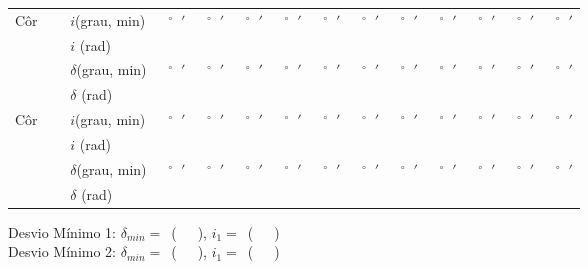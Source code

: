 \documentclass[a4paper,12pt]{article}  %
\begin{document}
\begin{center}
	\begin{tabular}{|l|l|r|r|r|r|r|r|r|r|r|r|r|}
	\hline
	\hline
	Côr $\quad$ & $i$(grau, min)   & $\;\;^{\circ}\;\;'$ & $\;\;^{\circ}\;\;'$ & $\;\;^{\circ}\;\;'$ & $\;\;^{\circ}\;\;'$ & $\;\;^{\circ}\;\;'$ & $\;\;^{\circ}\;\;'$ &  $\;\;^{\circ}\;\;'$& $\;\;^{\circ}\;\;'$ &  $\;\;^{\circ}\;\;'$& $\;\;^{\circ}\;\;'$ &  $\;\;^{\circ}\;\;'$  \\ \cline{2-13}
& $i$ (rad)   & & & & & & & & & & &  \\ \cline{2-13}
	 &  $\delta$(grau, min)&$\;\;^{\circ}\;\;'$ & $\;\;^{\circ}\;\;'$ & $\;\;^{\circ}\;\;'$ & $\;\;^{\circ}\;\;'$ & $\;\;^{\circ}\;\;'$ & $\;\;^{\circ}\;\;'$ &  $\;\;^{\circ}\;\;'$& $\;\;^{\circ}\;\;'$ &  $\;\;^{\circ}\;\;'$& $\;\;^{\circ}\;\;'$ &  $\;\;^{\circ}\;\;'$\\ \cline{2-13}
	&  $\delta$  (rad)   & & & & & & & & & & &  \\	\hline
	Côr $\quad$ & $i$(grau, min)   & $\;\;^{\circ}\;\;'$ & $\;\;^{\circ}\;\;'$ & $\;\;^{\circ}\;\;'$ & $\;\;^{\circ}\;\;'$ & $\;\;^{\circ}\;\;'$ & $\;\;^{\circ}\;\;'$ &  $\;\;^{\circ}\;\;'$& $\;\;^{\circ}\;\;'$ &  $\;\;^{\circ}\;\;'$& $\;\;^{\circ}\;\;'$ &  $\;\;^{\circ}\;\;'$  \\ \cline{2-13}
& $i$ (rad)   & & & & & & & & & & &  \\ \cline{2-13}
	 &  $\delta$(grau, min)&$\;\;^{\circ}\;\;'$ & $\;\;^{\circ}\;\;'$ & $\;\;^{\circ}\;\;'$ & $\;\;^{\circ}\;\;'$ & $\;\;^{\circ}\;\;'$ & $\;\;^{\circ}\;\;'$ &  $\;\;^{\circ}\;\;'$& $\;\;^{\circ}\;\;'$ &  $\;\;^{\circ}\;\;'$& $\;\;^{\circ}\;\;'$ &  $\;\;^{\circ}\;\;'$\\ \cline{2-13}
	&  $\delta$  (rad)   & & & & & & & & & & &  \\	\hline
	\hline
 	\end{tabular}
\end{center}

\noindent Desvio Mínimo 1:  $\delta_{min}=$~\underline{\makebox[1.5cm][r]{~}}(~~~), 
$i_1=$~\underline{\makebox[1.5cm][r]{~}}(~~~) 
\\
\noindent Desvio Mínimo 2:  $\delta_{min}=$~\underline{\makebox[1.5cm][r]{~}}(~~~), 
$i_1=$~\underline{\makebox[1.5cm][r]{~}}(~~~) 
\end{document}
